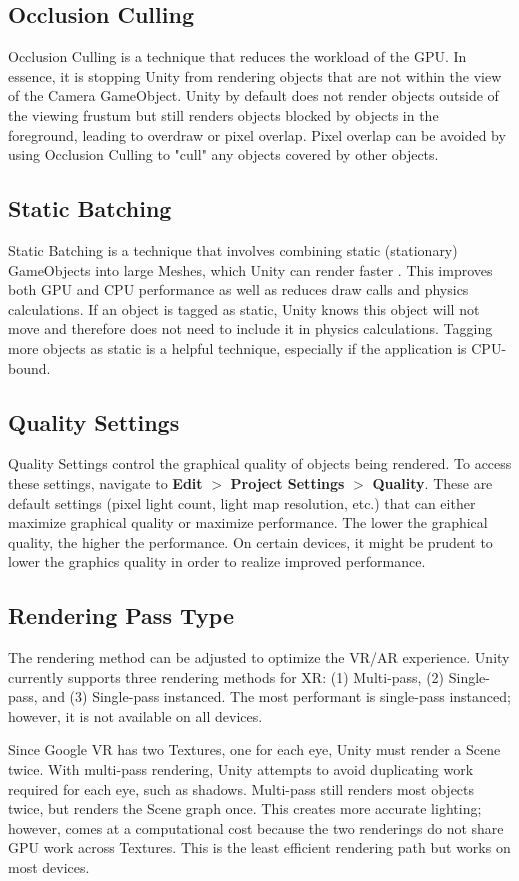 \documentclass{Style}
\begin{document}
\subsection{Occlusion Culling}
Occlusion Culling is a technique that reduces the workload of the GPU. In essence, it is stopping Unity from rendering objects that are not within the view of the Camera GameObject. Unity by default does not render objects outside of the viewing frustum but still renders objects blocked by objects in the foreground, leading to overdraw or pixel overlap. Pixel overlap can be avoided by using Occlusion Culling to "cull" any objects covered by other objects.

\subsection{Static Batching}
Static Batching is a technique that involves combining static (stationary) GameObjects into large Meshes, which Unity can render faster \parencite{Unity2021DrawCallBatching}. This improves both GPU and CPU performance as well as reduces draw calls and physics calculations. If an object is tagged as static, Unity knows this object will not move and therefore does not need to include it in physics calculations. Tagging more objects as static is a helpful technique, especially if the application is CPU-bound.

\subsection{Quality Settings}
Quality Settings control the graphical quality of objects being rendered. To access these settings, navigate to \textbf{Edit} $>$ \textbf{Project Settings} $>$ \textbf{Quality}. These are default settings (pixel light count, light map resolution, etc.) that can either maximize graphical quality or maximize performance. The lower the graphical quality, the higher the performance. On certain devices, it might be prudent to lower the graphics quality in order to realize improved performance.

\subsection{Rendering Pass Type}
The rendering method can be adjusted to optimize the VR/AR experience. Unity currently supports three rendering methods for XR: (1) Multi-pass, (2) Single-pass, and (3) Single-pass instanced. The most performant is single-pass instanced; however, it is not available on all devices.

Since Google VR has two Textures, one for each eye, Unity must render a Scene twice. With multi-pass rendering, Unity attempts to avoid duplicating work required for each eye, such as shadows. Multi-pass still renders most objects twice, but renders the Scene graph once. This creates more accurate lighting; however, comes at a computational cost because the two renderings do not share GPU work across Textures. This is the least efficient rendering path but works on most devices.

\printbibliography
\end{document}
